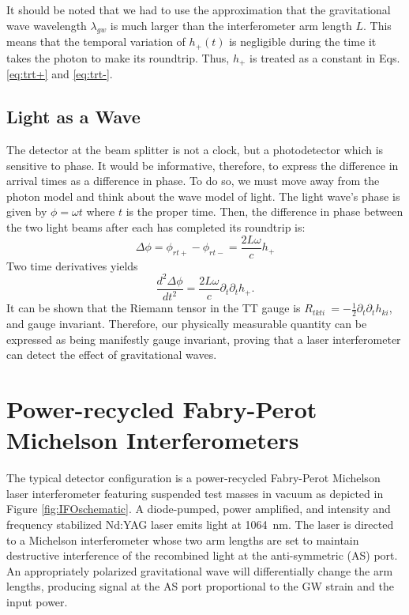 It should be noted that we had to use the approximation that the
gravitational wave wavelength $\lambda_{gw}$ is much larger than the
interferometer arm length $L$. This means that the temporal variation
of $h_+(t)$ is negligible during the time it takes the photon to make
its roundtrip. Thus, $h_+$ is treated as a constant in
Eqs. \ref{eq:trt+} and \ref{eq:trt-}.


\subsection{Light as a Wave}
The detector at the beam splitter is not a clock, but a photodetector
which is sensitive to phase. It would be informative, therefore, to express
the difference in arrival times as a difference in phase. To do so, we
must move away from the photon model and think about the wave model of
light.  The light wave's phase is given by $\phi = \omega t$ where $t$ is the proper time. Then, the
difference in phase between the two light beams after each has
completed its roundtrip is:
\begin{equation}
\Delta \phi = \phi_{rt+} - \phi_{rt-} = \frac{2 L \omega}{c} h_+
\end{equation}
Two time derivatives yields 
\begin{equation}
\frac{d^2\Delta \phi}{dt^2} = \frac{2 L \omega}{c} \partial_t \partial_t h_+.
\end{equation}
It can be shown \cite{Garfinkle2005Gauge} that the Riemann tensor in
the TT gauge is $R_{tkti}~=-\frac{1}{2}\partial_t \partial_t h_{ki}$,
and gauge invariant. Therefore, our
physically measurable quantity can be expressed as being manifestly
gauge invariant, proving that a laser interferometer can detect the
effect of gravitational waves.






\section{Power-recycled Fabry-Perot Michelson Interferometers}
The typical detector configuration is a power-recycled Fabry-Perot
Michelson laser interferometer featuring suspended test masses in
vacuum as depicted in Figure \ref{fig:IFOschematic}. A diode-pumped,
power amplified, and intensity and frequency stabilized Nd:YAG laser
emits light at 1064~nm. The laser is directed to a Michelson
interferometer whose two arm lengths are set to maintain destructive
interference of the recombined light at the anti-symmetric (AS)
port. An appropriately polarized gravitational wave will
differentially change the arm lengths, producing signal at the AS port
proportional to the GW strain and the input power. 

